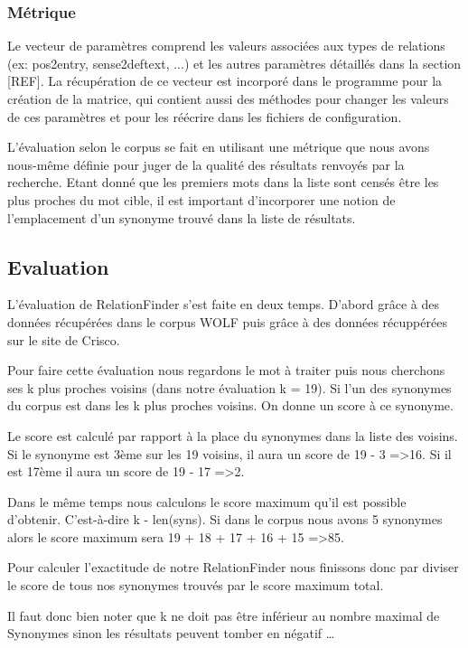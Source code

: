 \subsubsection{Métrique}

Le vecteur de paramètres comprend les valeurs associées aux types de relations 
(ex: pos2entry, sense2deftext, ...) et les autres paramètres détaillés dans la 
section [REF]. La récupération de ce vecteur est incorporé dans le programme 
pour la création de la matrice, qui contient aussi des méthodes pour changer 
les 
valeurs de ces paramètres et pour les réécrire dans les fichiers de 
configuration.

L'évaluation selon le corpus se fait en utilisant une métrique que nous 
avons nous-même définie pour juger de la qualité des résultats renvoyés par la 
recherche. Etant donné que les premiers mots dans la liste sont censés être les 
plus proches du mot cible, il est important d'incorporer une notion de 
l'emplacement d'un synonyme trouvé dans la liste de résultats.


\subsection{Evaluation}

L'évaluation de RelationFinder s'est faite en deux temps. D'abord grâce à des 
données récupérées dans le corpus WOLF puis grâce à des données récuppérées sur 
le site de Crisco.

Pour faire cette évaluation nous regardons le mot à traiter puis nous cherchons 
ses k plus proches voisins (dans notre évaluation k = 19). Si l'un des 
synonymes du corpus est dans les k plus proches voisins. On donne un score à ce 
synonyme.

Le score est calculé par rapport à la place du synonymes dans la liste des 
voisins. Si le synonyme est 3ème sur les 19 voisins, il aura un score de 19 - 3 
=\textgreater 16. Si il est 17ème il aura un score de 19 - 17 =\textgreater 2.

Dans le même temps nous calculons le score maximum qu'il est possible 
d'obtenir. C'est-à-dire k - len(syns). Si dans le corpus nous avons 5 synonymes 
alors le score maximum sera 19 + 18 + 17 + 16 + 15 =\textgreater 85.

Pour calculer l'exactitude de notre RelationFinder nous finissons donc par 
diviser le score de tous nos synonymes trouvés par le score maximum total.

Il faut donc bien noter que k ne doit pas être inférieur au nombre maximal de 
Synonymes sinon les résultats peuvent tomber en négatif \dots

